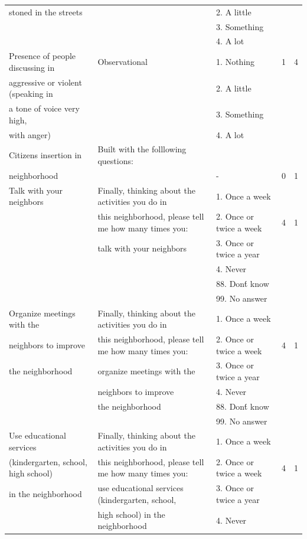 \documentclass[11pt]{article}
\begin{document}
\begin{landscape}
\begin{tiny}
\begin{tabular}{lllcc}
stoned in the streets	&		&	2. A little	&		&			\\
	&		&	3. Something	&		&			\\
	&		&	4. A lot	&		&			\\
Presence of people discussing in 	&	Observational	&	1. Nothing	&	1	&	4		\\
aggressive or violent (speaking in 	&		&	2. A little	&		&			\\
a tone of voice very high, 	&		&	3. Something	&		&			\\
with anger)	&		&	4. A lot	&		&			\\\hline
Citizens insertion in 	&	Built with the folllowing questions:	&		&		&			\\
neighborhood	&		&	-	&	0	&	1		\\\hline
Talk with your neighbors	&	Finally, thinking about the activities you do in 	&	1. Once a week	&		&			\\
	&	this neighborhood, please tell me how many times you:	&	2. Once or twice a week	&	4	&	1		\\
	&	talk with your neighbors	&	3. Once or twice a year	&		&			\\
	&		&	4. Never	&		&			\\
	&		&	88. Don\'t know 	&		&			\\
	&		&	99. No answer	&		&			\\
Organize meetings with the 	&	Finally, thinking about the activities you do in 	&	1. Once a week	&		&			\\
neighbors to improve 	&	this neighborhood, please tell me how many times you:	&	2. Once or twice a week	&	4	&	1		\\
the neighborhood	&	organize meetings with the 	&	3. Once or twice a year	&		&			\\
	&	neighbors to improve 	&	4. Never	&		&			\\
	&	the neighborhood	&	88. Don\'t know 	&		&			\\
	&		&	99. No answer	&		&			\\
Use educational services 	&	Finally, thinking about the activities you do in 	&	1. Once a week	&		&			\\
(kindergarten, school, high school)	&	this neighborhood, please tell me how many times you:	&	2. Once or twice a week	&	4	&	1		\\
 in the neighborhood	&	use educational services (kindergarten, school, 	&	3. Once or twice a year	&		&			\\
	&	high school) in the neighborhood	&	4. Never	&		&			\\

\end{tabular}
\end{tiny}
\end{landscape}
\end{document}
